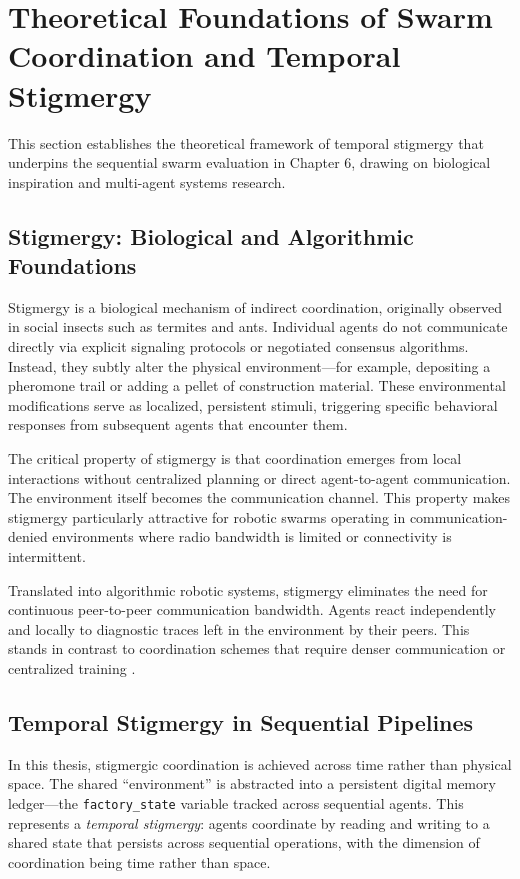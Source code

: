 \documentclass[12pt,a4paper,oneside]{report}
\begin{document}
\section{Theoretical Foundations of Swarm Coordination and Temporal Stigmergy}

This section establishes the theoretical framework of temporal stigmergy that underpins the sequential swarm evaluation in Chapter 6, drawing on biological inspiration and multi-agent systems research.

\subsection{Stigmergy: Biological and Algorithmic Foundations}

Stigmergy is a biological mechanism of indirect coordination, originally observed in social insects such as termites and ants. Individual agents do not communicate directly via explicit signaling protocols or negotiated consensus algorithms. Instead, they subtly alter the physical environment---for example, depositing a pheromone trail or adding a pellet of construction material. These environmental modifications serve as localized, persistent stimuli, triggering specific behavioral responses from subsequent agents that encounter them.

The critical property of stigmergy is that coordination emerges from local interactions without centralized planning or direct agent-to-agent communication. The environment itself becomes the communication channel. This property makes stigmergy particularly attractive for robotic swarms operating in communication-denied environments where radio bandwidth is limited or connectivity is intermittent.

Translated into algorithmic robotic systems, stigmergy eliminates the need for continuous peer-to-peer communication bandwidth. Agents react independently and locally to diagnostic traces left in the environment by their peers. This stands in contrast to coordination schemes that require denser communication or centralized training \cite{domberg2026selfadapting, daneshmand2026slowrl}.

\subsection{Temporal Stigmergy in Sequential Pipelines}

In this thesis, stigmergic coordination is achieved across time rather than physical space. The shared ``environment'' is abstracted into a persistent digital memory ledger---the \texttt{factory\_state} variable tracked across sequential agents. This represents a \textit{temporal stigmergy}: agents coordinate by reading and writing to a shared state that persists across sequential operations, with the dimension of coordination being time rather than space.
\end{document}
